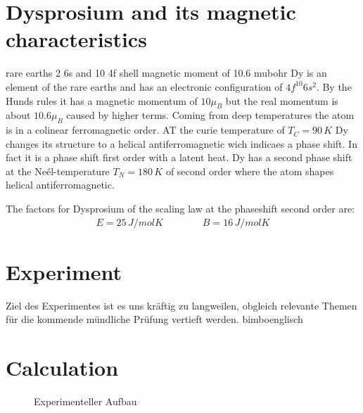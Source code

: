 \documentclass{include/thesisclass3}
\newcommand{\e}[1]{\,\si{#1}}
\begin{document}
\chapter{Dysprosium and its magnetic characteristics}
rare earths 2 6s and 10 4f shell
magnetic moment of 10.6 mubohr 
Dy is an element of the rare earths and has an electronic configuration of $4f^{10}6s^2$. By the Hunds rules it has a magnetic momentum of $10\mu_B$ but the real momentum is about $10.6\mu_B$ caused by higher terms.
Coming from deep temperatures the atom is in a colinear ferromagnetic order. AT the curie temperature of $T_C=90\e{K}$ Dy changes its structure to a helical antiferromagnetic wich indicaes a phase shift. In fact it is a phase shift first order with a latent heat. Dy has a second phase shift at the Neél-temperature $T_N=180\e{K}$ of second order where the atom shapes helical antiferromagnetic.

The factors for Dysprosium of the scaling law at the phaseshift second order are:
\begin{align*}
E=25\e{J/mol K}\qquad \qquad B=16\e{J/mol K}
\end{align*}
\chapter{Experiment}
Ziel des Experimentes ist es uns kräftig zu langweilen, obgleich relevante Themen für die kommende mündliche Prüfung vertieft werden. bimboenglisch
\chapter{Calculation}


\begin{figure}[ht]
	\begin{center}
		\caption{Experimenteller Aufbau}
		\label{aufbau}
	\end{center}
\end{figure}
\end{document}
